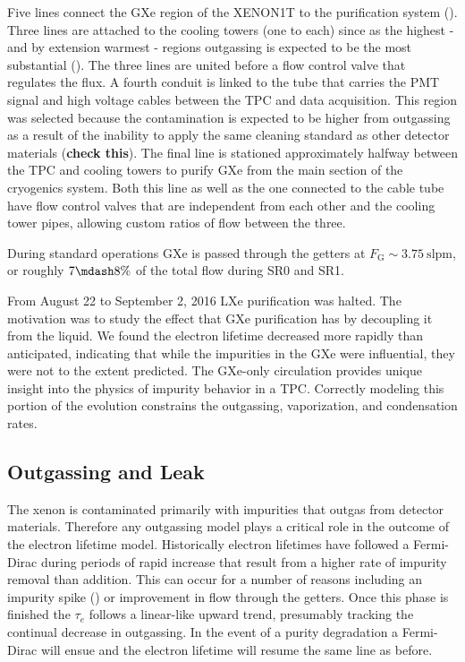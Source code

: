 Five lines connect the GXe region of the XENON1T to the purification system ().  Three lines are attached to
the cooling towers (one to each) since as the highest - and by extension warmest - regions outgassing is expected to be the most
substantial ().  The three lines are united before a flow control valve
that regulates the flux.  A fourth conduit is linked to the tube that carries the PMT signal and high voltage cables between the TPC and
data acquisition.  This region was selected because the contamination is expected to be higher from outgassing as a result of the
inability to apply the same cleaning standard as other detector materials (\textbf{check this}).  The final line is stationed
approximately halfway between the TPC and cooling towers to purify GXe from the main section of the cryogenics system.  Both this line as
well
as the one connected to the cable tube have flow control valves that are independent from each other and the cooling tower pipes, allowing
custom ratios of flow between the three.

During standard operations GXe is passed through the getters at $F_{\mathrm{G}} {\sim} 3.75\ \mathrm{slpm}$, or roughly $7 \mdash 8\%$ of
the total flow during SR0 and SR1.

From August 22 to September 2, 2016 LXe purification was halted.  The motivation was to study the effect that GXe purification has by
decoupling it from the liquid.  We found the electron lifetime decreased more rapidly than anticipated, indicating that while the
impurities in the GXe were influential, they were not to the extent predicted.  The GXe-only circulation provides unique insight into
the physics of impurity behavior in a TPC.  Correctly modeling this portion of the evolution constrains the outgassing, vaporization,
and condensation rates.



\subsection{Outgassing and Leak}
\label{subsec:electron_lifetime_model_outgassing}
The xenon is contaminated primarily with impurities that outgas from detector materials.  Therefore any outgassing model plays a
critical role in the outcome of the electron lifetime model.  Historically electron lifetimes have followed a Fermi-Dirac during periods
of rapid increase that result from a higher rate of impurity
removal than addition.  This can occur for a number of reasons including an impurity spike
() or improvement in flow through the getters.  Once this phase is
finished the $\tau_e$ follows a linear-like upward trend, presumably tracking the continual decrease in outgassing.  In the event of a
purity degradation a Fermi-Dirac will ensue and the electron lifetime will resume the same line as before.

